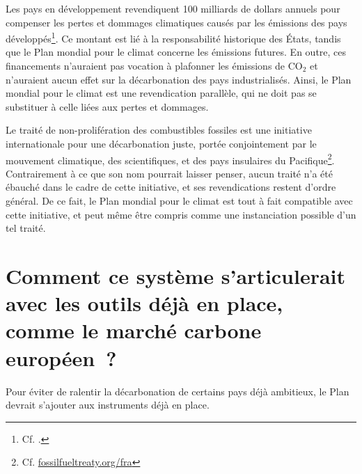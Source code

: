 \documentclass[a5paper,french,openany]{memoir}
\begin{document}
Les pays en développement revendiquent 100 milliards de dollars annuels pour compenser les pertes et dommages climatiques causés par les émissions des pays développés\footnote{Cf. \cite{tc_proposal_2023}.}. Ce montant est lié à la responsabilité historique des États, tandis que le Plan mondial pour le climat concerne les émissions futures. En outre, ces financements n'auraient pas vocation à plafonner les émissions de CO$_\text{2}$ et n'auraient aucun effet sur la décarbonation des pays industrialisés. Ainsi, le Plan mondial pour le climat est une revendication parallèle, qui ne doit pas se substituer à celle liées aux pertes et dommages.

Le traité de non-prolifération des combustibles fossiles est une initiative internationale pour une décarbonation juste, portée conjointement par le mouvement climatique, des scientifiques, et des pays insulaires du Pacifique\footnote{Cf. \href{https://fossilfueltreaty.org/fra}{fossilfueltreaty.org/fra}}. Contrairement à ce que son nom pourrait laisser penser, aucun traité n'a été ébauché dans le cadre de cette initiative, et ses revendications restent d'ordre général. De ce fait, le Plan mondial pour le climat est tout à fait compatible avec cette initiative, et peut même être compris comme une instanciation possible d'un tel traité.

\section*{\normalsize Comment ce système s'articulerait avec les outils déjà en place, comme le marché carbone européen~?}\label{q:ets}

Pour éviter de ralentir la décarbonation de certains pays déjà ambitieux, le Plan devrait s'ajouter aux instruments déjà en place. 
\end{document}
